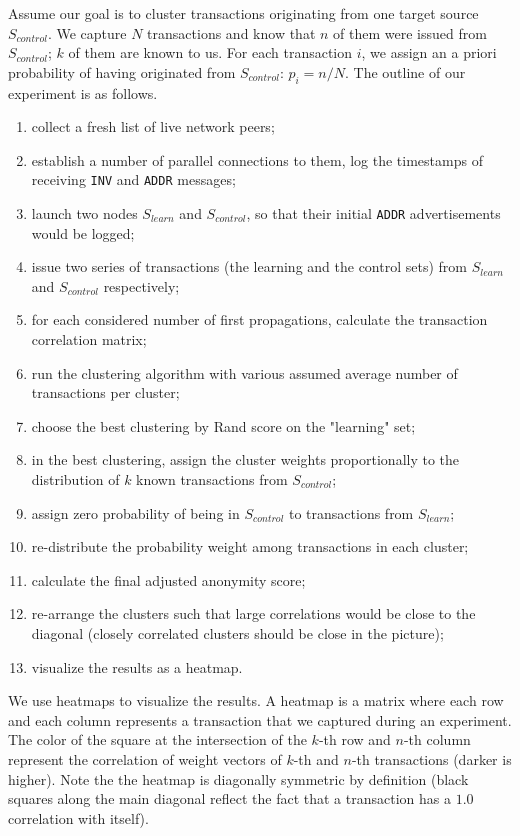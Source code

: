 Assume our goal is to cluster transactions originating from one target source $S_{control}$.
We capture $N$ transactions and know that $n$ of them were issued from $S_{control}$; $k$ of them are known to us.
For each transaction $i$, we assign an a priori probability of having originated from $S_{control}$: $p_i = n / N$.
The outline of our experiment is as follows.

\begin{enumerate}
	\item collect a fresh list of live network peers;
	\item establish a number of parallel connections to them, log the timestamps of receiving \texttt{INV} and \texttt{ADDR} messages;
	\item launch two nodes $S_{learn}$ and $S_{control}$, so that their initial \texttt{ADDR} advertisements would be logged;
	\item issue two series of transactions (the learning and the control sets) from $S_{learn}$ and $S_{control}$ respectively;
	\item for each considered number of first propagations, calculate the transaction correlation matrix;
	\item run the clustering algorithm with various assumed average number of transactions per cluster;
	\item choose the best clustering by Rand score on the "learning" set;
	\item in the best clustering, assign the cluster weights proportionally to the distribution of $k$ known transactions from $S_{control}$;
	\item assign zero probability of being in $S_{control}$ to transactions from $S_{learn}$;
	\item re-distribute the probability weight among transactions in each cluster;
	\item calculate the final adjusted anonymity score;
	\item re-arrange the clusters such that large correlations would be close to the diagonal (closely correlated clusters should be close in the picture);
	\item visualize the results as a heatmap.
\end{enumerate}

We use heatmaps to visualize the results.
A heatmap is a matrix where each row and each column represents a transaction that we captured during an experiment.
The color of the square at the intersection of the $k$-th row and $n$-th column represent the correlation of weight vectors of $k$-th and $n$-th transactions (darker is higher).
Note the the heatmap is diagonally symmetric by definition (black squares along the  main diagonal reflect the fact that a transaction has a $1.0$ correlation with itself).

